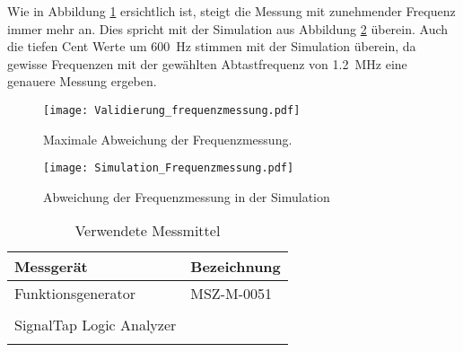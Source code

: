  Wie in Abbildung \ref{img:plot_frequenzmessung} ersichtlich ist, steigt die Messung mit zunehmender Frequenz immer mehr an. Dies spricht mit der Simulation aus  Abbildung \ref{img:plot_freq_sim} überein. Auch die tiefen Cent Werte um \SI{600}{Hz} stimmen mit der Simulation überein, da gewisse Frequenzen mit der gewählten Abtastfrequenz von \SI{1.2}{MHz} eine genauere Messung ergeben.
 \begin{figure}[h]
 	\centering
 	\texttt{[image: Validierung\_frequenzmessung.pdf]}
 	\caption{Maximale Abweichung der Frequenzmessung.}
 	\label{img:plot_frequenzmessung}
 \end{figure}
 \begin{figure}[h]
	\centering
	\texttt{[image: Simulation\_Frequenzmessung.pdf]}
	\caption{Abweichung der Frequenzmessung in der Simulation}
	\label{img:plot_freq_sim}
\end{figure}
\begin{table}[H]
	\centering
	\caption{Verwendete Messmittel}
	\label{tab:Verwendete_Messmittel_freq}
	\begin{tabular}{l|l}
		\textbf{Messgerät} & \textbf{Bezeichnung}	\\
		\hline \hline
		
		Funktionsgenerator  & MSZ-M-0051   \\ 
		&        \\ 
		\hline
		SignalTap Logic Analyzer  &    \\ 
		&        \\ 
			\hline
	\end{tabular}
\end{table} 
